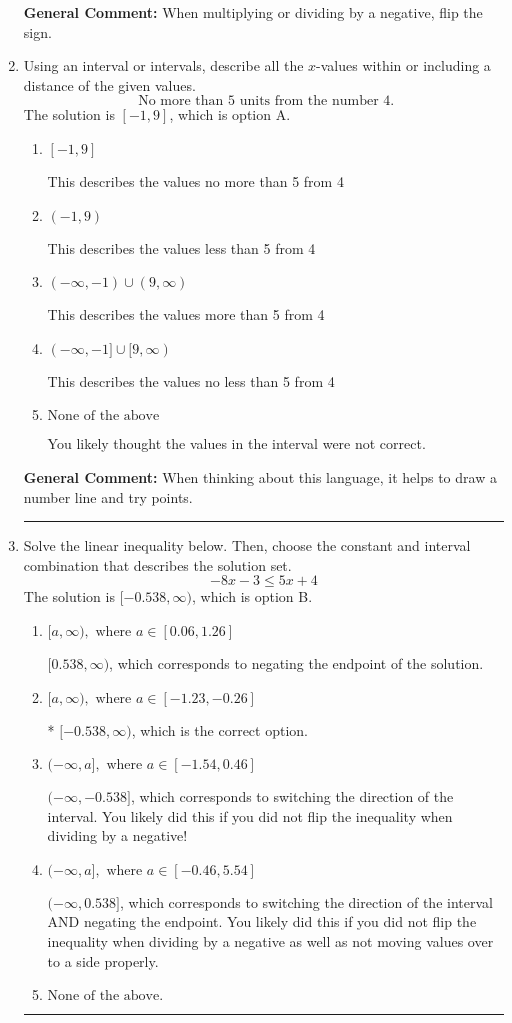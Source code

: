 \documentclass{extbook}[14pt]
\newcommand{\litem}[1]{\item #1

\rule{\textwidth}{0.4pt}}
\begin{document}
\begin{enumerate}
{\textbf{General Comment:} When multiplying or dividing by a negative, flip the sign.
}
\litem{
Using an interval or intervals, describe all the $x$-values within or including a distance of the given values.
\[ \text{ No more than } 5 \text{ units from the number } 4. \]The solution is \( [-1, 9] \), which is option A.\begin{enumerate}[label=\Alph*.]
\item \( [-1, 9] \)

This describes the values no more than 5 from 4
\item \( (-1, 9) \)

This describes the values less than 5 from 4
\item \( (-\infty, -1) \cup (9, \infty) \)

This describes the values more than 5 from 4
\item \( (-\infty, -1] \cup [9, \infty) \)

This describes the values no less than 5 from 4
\item \( \text{None of the above} \)

You likely thought the values in the interval were not correct.
\end{enumerate}

\textbf{General Comment:} When thinking about this language, it helps to draw a number line and try points.
}
\litem{
Solve the linear inequality below. Then, choose the constant and interval combination that describes the solution set.
\[ -8x -3 \leq 5x + 4 \]The solution is \( [-0.538, \infty) \), which is option B.\begin{enumerate}[label=\Alph*.]
\item \( [a, \infty), \text{ where } a \in [0.06, 1.26] \)

 $[0.538, \infty)$, which corresponds to negating the endpoint of the solution.
\item \( [a, \infty), \text{ where } a \in [-1.23, -0.26] \)

* $[-0.538, \infty)$, which is the correct option.
\item \( (-\infty, a], \text{ where } a \in [-1.54, 0.46] \)

 $(-\infty, -0.538]$, which corresponds to switching the direction of the interval. You likely did this if you did not flip the inequality when dividing by a negative!
\item \( (-\infty, a], \text{ where } a \in [-0.46, 5.54] \)

 $(-\infty, 0.538]$, which corresponds to switching the direction of the interval AND negating the endpoint. You likely did this if you did not flip the inequality when dividing by a negative as well as not moving values over to a side properly.
\item \( \text{None of the above}. \)


\end{enumerate}}
\end{enumerate}
\end{document}

